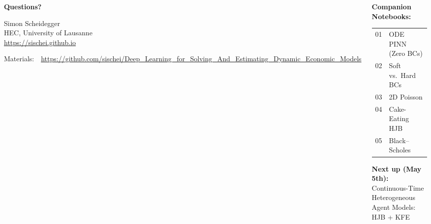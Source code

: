 \documentclass[aspectratio=169,11pt]{beamer}
\begin{document}
\begin{frame}{}
\begin{columns}[c]
\begin{center}
{\Huge \textcolor{uzhblue}{\textbf{Questions?}}}

\vspace{1.0cm}
{\large Simon Scheidegger}\\[4pt]
{\small HEC, University of Lausanne}\\[4pt]
\url{https://sischei.github.io}

\vspace{0.6cm}
{\small Materials:~~\url{https://github.com/sischei/Deep_Learning_for_Solving_And_Estimating_Dynamic_Economic_Models}}
\end{center}

\begin{center}
\textbf{Companion Notebooks:}\\[8pt]
{\small
\begin{tabular}{rl}
01 & ODE PINN (Zero BCs) \\
02 & Soft vs.\ Hard BCs \\
03 & 2D Poisson \\
04 & Cake-Eating HJB \\
05 & Black--Scholes \\
\end{tabular}
}

\vspace{0.8cm}
\textbf{Next up (May 5th):}\\[6pt]
{\large Continuous-Time Heterogeneous}\\
{\large Agent Models: HJB + KFE}\\[8pt]
\end{center}
\end{columns}
\end{frame}
\end{document}
